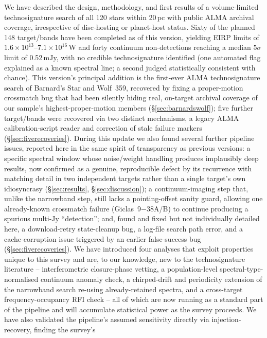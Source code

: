 \documentclass{openjournal}
\begin{document}
We have described the design, methodology, and first results of a
volume-limited technosignature search of all 120 stars within 20\,pc
with public ALMA archival coverage, irrespective of disc-hosting or
planet-host status. Sixty of the planned 148 target/bands have been
completed as of this version, yielding EIRP limits of
$1.6\times10^{13}$--$7.1\times10^{16}$\,W and forty continuum
non-detections reaching a median $5\sigma$ limit of 0.52\,mJy, with no
credible technosignature identified (one automated flag explained as a
known spectral line; a second judged statistically consistent with
chance). This version's principal addition is the first-ever ALMA
technosignature search of Barnard's Star and Wolf~359, recovered by
fixing a proper-motion crossmatch bug that had been silently hiding
real, on-target archival coverage of our sample's highest-proper-motion
members (\S\ref{sec:barnardswolf}); five further target/bands were
recovered via two distinct mechanisms, a legacy ALMA calibration-script
reader and correction of stale failure markers
(\S\ref{sec:fiverecoveries}). During this update we also found several
further pipeline issues, reported here in the same spirit of
transparency as previous versions: a specific spectral window whose
noise/weight handling produces implausibly deep results, now confirmed as
a genuine, reproducible defect by its recurrence with matching detail in
two independent targets rather than a single target's own idiosyncrasy
(\S\ref{sec:results}, \S\ref{sec:discussion}); a continuum-imaging
step that, unlike the narrowband step, still lacks a pointing-offset
sanity guard, allowing one already-known crossmatch failure
(Giclas~9$-$38A/B) to continue producing a spurious multi-Jy
``detection''; and, found and fixed but not individually detailed here,
a download-retry state-cleanup bug, a log-file search path error, and a
cache-corruption issue triggered by an earlier false-success bug
(\S\ref{sec:fiverecoveries}). We have introduced four analyses
that exploit properties unique to this survey and are, to our knowledge,
new to the technosignature literature -- interferometric closure-phase
vetting, a population-level spectral-type-normalised continuum anomaly
check, a chirped-drift and periodicity extension of the narrowband
search re-using already-retained spectra, and a cross-target
frequency-occupancy RFI check -- all of which are now running as a
standard part of the pipeline and will accumulate statistical power as
the survey proceeds. We have also validated the pipeline's assumed
sensitivity directly via injection-recovery, finding the survey's
\end{document}
